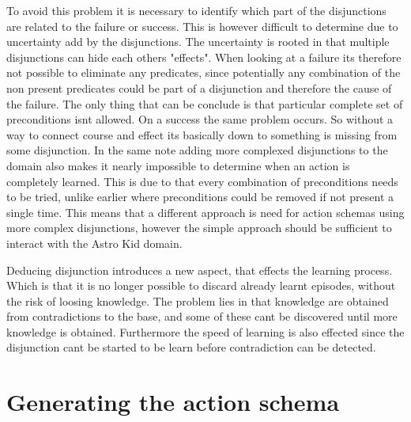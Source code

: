 	To avoid this problem it is necessary to identify which part of the disjunctions are related to the failure or success. This is however difficult to determine due to uncertainty add by the disjunctions. The uncertainty is rooted in that multiple disjunctions can hide each others "effects". When looking at a failure its therefore not possible to eliminate any predicates, since potentially any combination of the non present predicates could be part of a disjunction and therefore the cause of the failure. The only thing that can be conclude is that particular complete set of preconditions isnt allowed. On a success the same problem occurs. So without a way to connect course and effect its basically down to something is missing from some disjunction. In the same note adding more complexed disjunctions to the domain also makes it nearly impossible to determine when an action is completely learned. This is due to that every combination of preconditions needs to be tried, unlike earlier where preconditions could be removed if not present a single time. This means that a different approach is need for action schemas using more complex disjunctions, however the simple approach should be sufficient to interact with the Astro Kid domain.
	 
	

%	
	


	Deducing disjunction introduces a new aspect, that effects the learning process.  Which is that it is no longer possible to discard already learnt episodes,  without the risk of loosing knowledge. The problem lies in that knowledge are obtained from contradictions to the base, and some of these cant be discovered until more knowledge is obtained. Furthermore the speed of learning is also effected since the disjunction cant be started to be learn before contradiction can be detected. 
	
	
	
	
\section{Generating the action schema}	
	
